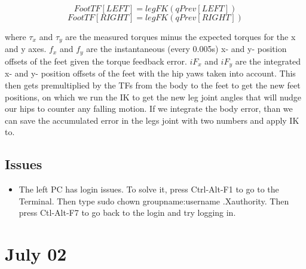 \documentclass[letterpaper, 10 pt]{report}
\begin{document}
\begin{itemize}
\begin{equation}
FootTF[LEFT] = legFK(qPrev[LEFT])
\end{equation}
\begin{equation}
FootTF[RIGHT] = legFK(qPrev[RIGHT])
\end{equation}

where $\tau_x$ and $\tau_y$ are the measured torques minus the expected torques for the x and y axes. $f_x$ and $f_y$ are the instantaneous (every 0.005s) x- and y- position offsets of the feet given the torque feedback error. $iF_x$ and $iF_y$ are the integrated x- and y- position offsets of the feet with the hip yaws taken into account. This then gets premultiplied by the TFs from the body to the feet to get the new feet positions, on which we run the IK to get the new leg joint angles that will nudge our hips to counter any falling motion.
If we integrate the body error, than we can save the accumulated error in the legs joint with two numbers and apply IK to.
\end{itemize}
\subsection*{Issues}
\begin{itemize}
\item The left PC has login issues. To solve it, press Ctrl-Alt-F1 to go to the Terminal. Then type sudo chown groupname:username .Xauthority. Then press Ctl-Alt-F7 to go back to the login and try logging in.
\end{itemize}

\section*{July 02}
\end{document}
